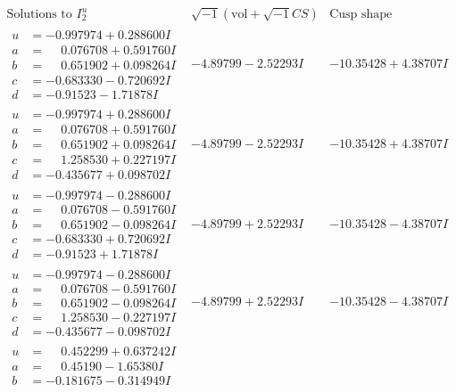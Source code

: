 \documentclass[1p]{elsarticle_modified}
\theoremstyle{definition}
\newcommand{\I}{\sqrt{-1}}
\begin{document}
$$\begin{array}{c|c|c}  
\text{Solutions to }I^u_{2}& \I (\text{vol} + \sqrt{-1}CS) & \text{Cusp shape}\\
 \hline 
\begin{aligned}
u &= -0.997974 + 0.288600 I \\
a &= \phantom{-}0.076708 + 0.591760 I \\
b &= \phantom{-}0.651902 + 0.098264 I \\
c &= -0.683330 - 0.720692 I \\
d &= -0.91523 - 1.71878 I\end{aligned}
 & -4.89799 - 2.52293 I & -10.35428 + 4.38707 I \\ \hline\begin{aligned}
u &= -0.997974 + 0.288600 I \\
a &= \phantom{-}0.076708 + 0.591760 I \\
b &= \phantom{-}0.651902 + 0.098264 I \\
c &= \phantom{-}1.258530 + 0.227197 I \\
d &= -0.435677 + 0.098702 I\end{aligned}
 & -4.89799 - 2.52293 I & -10.35428 + 4.38707 I \\ \hline\begin{aligned}
u &= -0.997974 - 0.288600 I \\
a &= \phantom{-}0.076708 - 0.591760 I \\
b &= \phantom{-}0.651902 - 0.098264 I \\
c &= -0.683330 + 0.720692 I \\
d &= -0.91523 + 1.71878 I\end{aligned}
 & -4.89799 + 2.52293 I & -10.35428 - 4.38707 I \\ \hline\begin{aligned}
u &= -0.997974 - 0.288600 I \\
a &= \phantom{-}0.076708 - 0.591760 I \\
b &= \phantom{-}0.651902 - 0.098264 I \\
c &= \phantom{-}1.258530 - 0.227197 I \\
d &= -0.435677 - 0.098702 I\end{aligned}
 & -4.89799 + 2.52293 I & -10.35428 - 4.38707 I \\ \hline\begin{aligned}
u &= \phantom{-}0.452299 + 0.637242 I \\
a &= \phantom{-}0.45190 - 1.65380 I \\
b &= -0.181675 - 0.314949 I \\

\end{aligned}
\end{array}$$
\end{document}
